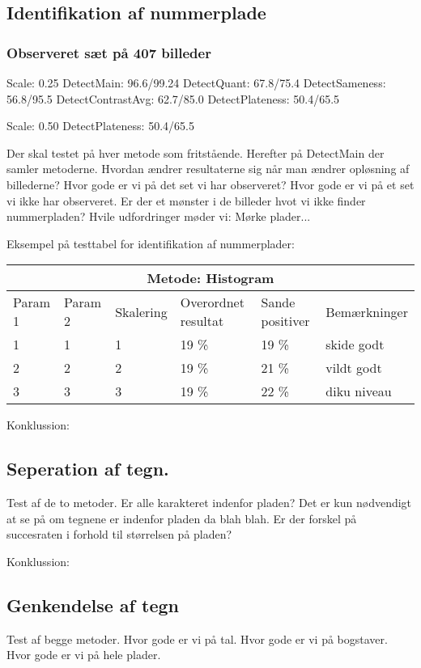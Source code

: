 \subsection{Identifikation af nummerplade}

\subsubsection*{Observeret sæt på 407 billeder}
Scale: 0.25
DetectMain: 96.6/99.24
DetectQuant: 67.8/75.4
DetectSameness: 56.8/95.5
DetectContrastAvg: 62.7/85.0
DetectPlateness: 50.4/65.5

Scale: 0.50
DetectPlateness: 50.4/65.5


Der skal testet på hver metode som fritstående. Herefter på DetectMain der samler metoderne. Hvordan ændrer resultaterne sig når man ændrer opløsning af billederne?
Hvor gode er vi på det set vi har observeret? Hvor gode er vi på et set vi ikke har observeret. Er der et mønster i de billeder hvot vi ikke finder nummerpladen? Hvile udfordringer møder vi: Mørke plader... 



Eksempel på testtabel for identifikation af nummerplader:

\begin{tabular}{|l|l|l|l|l|l|}
\hline
\multicolumn{6}{|c|}{Metode: Histogram} \\ \hline
Param 1 & Param 2 & Skalering & Overordnet resultat & Sande positiver & Bemærkninger\\ \hline
1 & 1 & 1 & 19 \% & 19 \% & skide godt\\ \hline
2 & 2 & 2 & 19 \% & 21 \% & vildt godt \\ \hline
3 & 3 & 3 & 19 \% & 22 \% & diku niveau \\
\hline
\end{tabular}

Konklussion:

\subsection{Seperation af tegn.}
Test af de to metoder.
Er alle karakteret indenfor pladen? Det er kun nødvendigt at se på om tegnene er indenfor pladen da blah blah. Er der forskel på succesraten i forhold til størrelsen på pladen?

Konklussion:

\subsection{Genkendelse af tegn}
Test af begge metoder.
Hvor gode er vi på tal. Hvor gode er vi på bogstaver. Hvor gode er vi på hele plader.